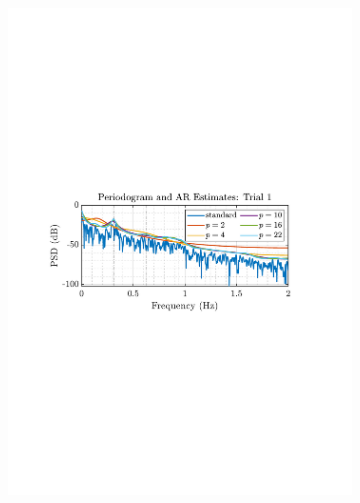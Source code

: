 \documentclass[12pt]{article}
\begin{document}
		\begin{figure}[H]
			\begin{subfigure}{0.49\textwidth}
				\includegraphics[trim={2.2cm 11.2cm 3.15cm  11.2cm}, clip, width=\textwidth]{../MATLAB/figures/q1_5c_fig01.pdf} 
				\caption{}
			\end{subfigure}
			\begin{subfigure}{0.49\textwidth}

\end{subfigure}
\end{figure}
\end{document}
